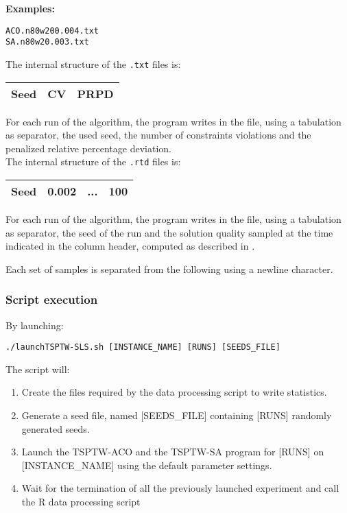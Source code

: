 \documentclass{article}
\begin{document}
					 
\textbf{Examples:} \begin{verbatim}
ACO.n80w200.004.txt
SA.n80w20.003.txt
\end{verbatim}


The internal structure of the \verb|.txt| files is: 
\begin{tabular}{|c|c|c|}
\hline
\textbf{Seed}	&	\textbf{CV} & \textbf{PRPD} \\ \hline
\end{tabular}

For each run of the algorithm, the program writes in the file, using a tabulation as separator, the used seed, the number of constraints violations and the penalized relative percentage deviation. \\

The internal structure of the \verb|.rtd| files is: 
\begin{tabular}{|c|c|c|c|}
\hline
\textbf{Seed}	&	\textbf{0.002} & \textbf{...} & \textbf{100}  \\ \hline
\end{tabular}

For each run of the algorithm, the program writes in the file, using a tabulation as separator, the seed of the run and the solution quality sampled at the time indicated in the column header, computed as described in .

Each set of samples is separated from the following using a newline character.


\subsubsection{Script execution}
By launching:
\begin{center}
\begin{verbatim}
./launchTSPTW-SLS.sh [INSTANCE_NAME] [RUNS] [SEEDS_FILE]
\end{verbatim}
\end{center}

The script will:
\begin{enumerate}
  \item Create the files required by the data processing script to write statistics.
  \item Generate a seed file, named [SEEDS\_FILE] containing [RUNS] randomly generated seeds.
  \item Launch the TSPTW-ACO and the TSPTW-SA program for [RUNS] on [INSTANCE\_NAME] using the default parameter settings.
  \item Wait for the termination of all the previously launched experiment and call the R data processing script
\end{enumerate}
\end{document}
